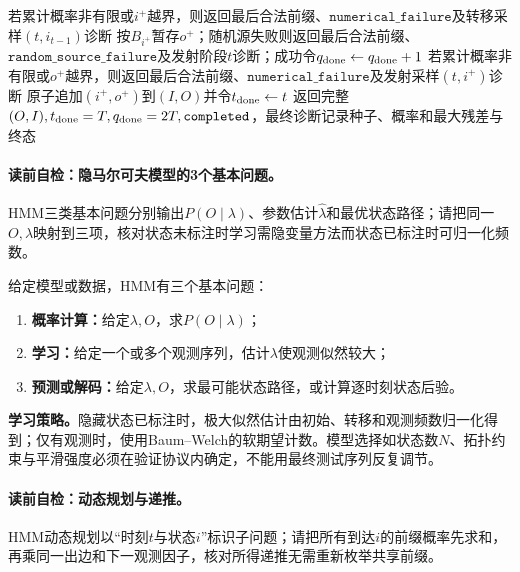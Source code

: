 \begin{AlgorithmContract}
\begin{algorithm}[H]
{  若累计概率非有限或$i^+$越界，则返回最后合法前缀、$\mathtt{numerical\_failure}$及转移采样$(t,i_{t-1})$诊断\;
  按$B_{i^+}$暂存$o^+$；随机源失败则返回最后合法前缀、$\mathtt{random\_source\_failure}$及发射阶段$t$诊断；成功令$q_{\rm done}\leftarrow q_{\rm done}+1$\;
  若累计概率非有限或$o^+$越界，则返回最后合法前缀、$\mathtt{numerical\_failure}$及发射采样$(t,i^+)$诊断\;
  原子追加$(i^+,o^+)$到$(I,O)$并令$t_{\rm done}\leftarrow t$\;
}
返回完整$(O,I),t_{\rm done}=T,q_{\rm done}=2T,\mathtt{completed}$，最终诊断记录种子、概率和最大残差与终态\;
\end{algorithm}
\end{AlgorithmContract}

\paragraph{读前自检：隐马尔可夫模型的3个基本问题。}HMM三类基本问题分别输出$P(O\mid\lambda)$、参数估计$\widehat\lambda$和最优状态路径；请把同一$O,\lambda$映射到三项，核对状态未标注时学习需隐变量方法而状态已标注时可归一化频数。\par

给定模型或数据，HMM有三个基本问题：
\begin{enumerate}[leftmargin=2.2em]
  \item \textbf{概率计算：}给定$\lambda,O$，求$P(O\mid\lambda)$；
  \item \textbf{学习：}给定一个或多个观测序列，估计$\lambda$使观测似然较大；
  \item \textbf{预测或解码：}给定$\lambda,O$，求最可能状态路径，或计算逐时刻状态后验。
\end{enumerate}

\label{struct:V3-C05-CH09}
\textbf{学习策略。}隐藏状态已标注时，极大似然估计由初始、转移和观测频数归一化得到；仅有观测时，使用Baum--Welch的软期望计数。模型选择如状态数$N$、拓扑约束与平滑强度必须在验证协议内确定，不能用最终测试序列反复调节。


\paragraph{读前自检：动态规划与递推。}HMM动态规划以“时刻$t$与状态$i$”标识子问题；请把所有到达$i$的前缀概率先求和，再乘同一出边和下一观测因子，核对所得递推无需重新枚举共享前缀。\par

